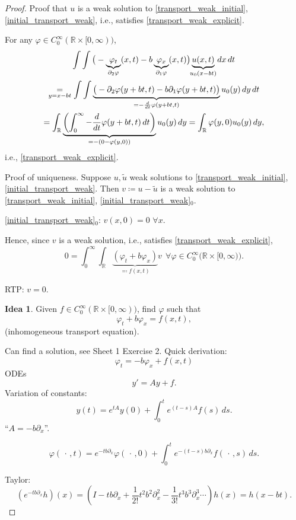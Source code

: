 \documentclass[12pt]{article}
\theoremstyle{definition}
\newtheorem*{idea}{Idea}
\begin{document}
\begin{proof}
Proof that $u$ is a weak solution to \eqref{transport_weak_initial}, \eqref{initial_transport_weak}, i.e., satisfies \eqref{transport_weak_explicit}.

For any $\varphi\in C_0^{\infty}(\mathbb{R}\times[0,\infty))$,
\begin{multline*}
\int\int\big(-\underbrace{\varphi_t}_{\mathclap{\partial_2\varphi}}(x,t)-b\underbrace{\varphi_x}_{\mathclap{\partial_1\varphi}}(x,t)\big)\underbrace{u(x,t)}_{\mathclap{u_0(x-bt)}}\,dx\,dt\\
\underset{y=x-bt}{=}\int\int\underbrace{\big(-\partial_2\varphi(y+bt,t)-b\partial_1\varphi(y+bt,t)\big)}_{=-\frac{d}{dt}\varphi(y+bt,t)}u_0(y)\,dy\,dt\\
=\int_{\mathbb{R}}\underbrace{\left(\int_0^{\infty}-\frac{d}{dt}\varphi(y+bt,t)\,dt\right)}_{=-(0-\varphi(y,0))}u_0(y)\,dy=\int_{\mathbb{R}}\varphi(y,0)u_0(y)\,dy,
\end{multline*}
i.e., \eqref{transport_weak_explicit}.

Proof of uniqueness. Suppose $u,\tilde{u}$ weak solutions to \eqref{transport_weak_initial}, \eqref{initial_transport_weak}. Then $v\coloneqq u-\tilde{u}$ is a weak solution to \eqref{transport_weak_initial}, \eqref{initial_transport_weak}$_0$.

\eqref{initial_transport_weak}$_0$: $v(x,0)=0$ $\forall x$.

Hence, since $v$ is a weak solution, i.e., satisfies \eqref{transport_weak_explicit},
\[0=\int_0^{\infty}\int_{\mathbb{R}}\underbrace{(\varphi_t+b\varphi_x)}_{\eqqcolon f(x,t)}v\ \ \forall\varphi\in C_0^{\infty}\big(\mathbb{R}\times[0,\infty)\big).\]

RTP: $v=0$.

\begin{idea}
Given $f\in C_0^{\infty}(\mathbb{R}\times[0,\infty))$, find $\varphi$ such that
\[\varphi_t+b\varphi_x=f(x,t),\]
(inhomogeneous transport equation).
\end{idea}

Can find a solution, see Sheet 1 Exercise 2. Quick derivation:
\[\varphi_t=-b\varphi_x+f(x,t)\]
ODEs
\[y'=Ay+f.\]
Variation of constants:
\[y(t)=e^{tA}y(0)+\int_0^te^{(t-s)A}f(s)\,ds.\]
``$A=-b\partial_x$''.

\[\varphi(\,\cdot\,,t)=e^{-tb\partial_x}\varphi(\,\cdot\,,0)+\int_0^te^{-(t-s)b\partial_x}f(\,\cdot\,,s)\,ds.\]

Taylor:
\[(e^{-tb\partial_x}h)(x)=\left(I-tb\partial_x+\frac{1}{2!}t^2b^2\partial_x^2-\frac{1}{3!}t^3b^3\partial_x^3\cdots\right)h(x)=h(x-bt).\]


\end{proof}
\end{document}
